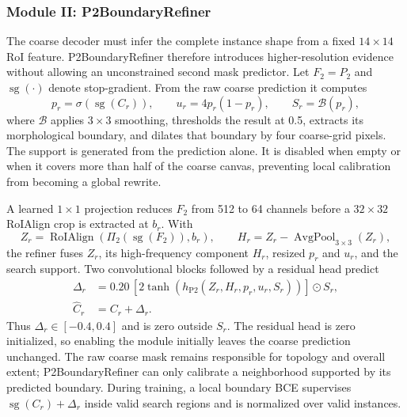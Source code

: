 \documentclass[letterpaper,journal]{IEEEtran}
\begin{document}
\subsubsection{Module II: P2BoundaryRefiner}
The coarse decoder must infer the complete instance shape from a fixed $14\times14$ RoI feature. P2BoundaryRefiner therefore introduces higher-resolution evidence without allowing an unconstrained second mask predictor. Let $F_2=P_2$ and $\operatorname{sg}(\cdot)$ denote stop-gradient. From the raw coarse prediction it computes
\begin{equation}
p_r=\sigma(\operatorname{sg}(C_r)), \qquad
u_r=4p_r(1-p_r), \qquad
S_r=\mathcal{B}(p_r),
\label{eq:p2_support}
\end{equation}
where $\mathcal{B}$ applies $3\times3$ smoothing, thresholds the result at 0.5, extracts its morphological boundary, and dilates that boundary by four coarse-grid pixels. The support is generated from the prediction alone. It is disabled when empty or when it covers more than half of the coarse canvas, preventing local calibration from becoming a global rewrite.

A learned $1\times1$ projection reduces $F_2$ from 512 to 64 channels before a $32\times32$ RoIAlign crop is extracted at $b_r$. With
\begin{equation}
Z_r=\operatorname{RoIAlign}(\Pi_2(\operatorname{sg}(F_2)),b_r),
\qquad
H_r=Z_r-\operatorname{AvgPool}_{3\times3}(Z_r),
\end{equation}
the refiner fuses $Z_r$, its high-frequency component $H_r$, resized $p_r$ and $u_r$, and the search support. Two convolutional blocks followed by a residual head predict
\begin{equation}
\begin{aligned}
\Delta_r&=0.20\,[2\tanh(h_{\mathrm{P2}}(
Z_r,H_r,p_r,u_r,S_r))]\odot S_r,\\
\widehat C_r&=C_r+\Delta_r.
\end{aligned}
\label{eq:p2_refinement}
\end{equation}
Thus $\Delta_r\in[-0.4,0.4]$ and is zero outside $S_r$. The residual head is zero initialized, so enabling the module initially leaves the coarse prediction unchanged. The raw coarse mask remains responsible for topology and overall extent; P2BoundaryRefiner can only calibrate a neighborhood supported by its predicted boundary. During training, a local boundary BCE supervises $\operatorname{sg}(C_r)+\Delta_r$ inside valid search regions and is normalized over valid instances.
\end{document}

